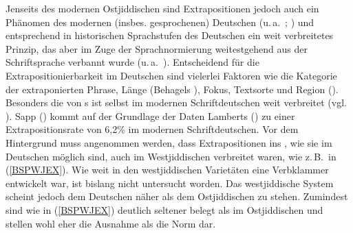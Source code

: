 \noindent  Jenseits des modernen Ostjiddischen sind Extrapositionen jedoch auch ein Phänomen des modernen (insbes. gesprochenen) Deutschen (u.\,a.\, \citealt{Vinckel2006,Lambert1976}; \citealt[477]{HelbigBuscha2001}) und entsprechend in historischen Sprachstufen des Deutschen ein weit verbreitetes Prinzip, das aber im Zuge der Sprachnormierung weitestgehend aus der Schriftsprache verbannt wurde (u.\,a.\, \citealt{Sapp2014,Ebert1980,Ebert1981}). Entscheidend für die Extrapositionierbarkeit im Deutschen sind vielerlei Faktoren wie die Kategorie der extraponierten Phrase, Länge (Behagels \citeyear{Behaghel1909} ), Fokus, Textsorte und Region (\citealt{Sapp2014,Lambert1976}). Besonders die  von \hai{{\PP}}s ist selbst im modernen Schriftdeutschen weit verbreitet (vgl.\, \citealt[477]{HelbigBuscha2001}). Sapp (\citeyear[148, Tabelle 15]{Sapp2014}) kommt auf der Grundlage der Daten Lamberts (\citeyear[137]{Lambert1976}) zu einer Extrapositionsrate von 6,2\% im modernen Schriftdeutschen. Vor dem Hintergrund muss angenommen werden, dass Extrapositionen ins , wie sie im Deutschen möglich sind, auch im Westjiddischen verbreitet waren, wie z.\,B.\, in (\ref{BSPWJEX}). Wie weit in den westjiddischen Varietäten eine Verbklammer entwickelt war, ist bislang nicht untersucht worden. Das westjiddische System scheint jedoch dem Deutschen näher als dem Ostjiddischen zu stehen. Zumindest sind  wie in (\ref{BSPWJEX}) deutlich seltener belegt als im Ostjiddischen und stellen wohl eher die Ausnahme als die Norm dar.  
   
   
